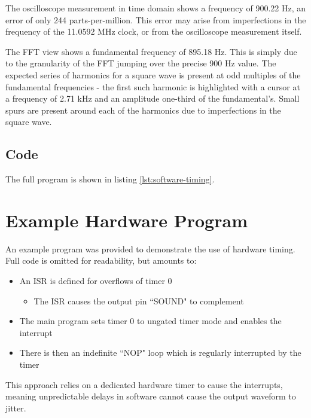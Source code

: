\documentclass[11pt]{article}
\begin{document}
The oscilloscope measurement in time domain shows a frequency of 900.22 Hz, an error of only 244 parts-per-million. This error may arise from imperfections in the frequency of the 11.0592 MHz clock, or from the oscilloscope measurement itself.

The FFT view shows a fundamental frequency of 895.18 Hz. This is simply due to the granularity of the FFT jumping over the precise 900 Hz value. The expected series of harmonics for a square wave is present at odd multiples of the fundamental frequencies - the first such harmonic is highlighted with a cursor at a frequency of 2.71 kHz and an amplitude one-third of the fundamental's. Small spurs are present around each of the harmonics due to imperfections in the square wave.

\subsection{Code}

The full program is shown in listing \ref{lst:software-timing}.



\section{Example Hardware Program}
An example program was provided to demonstrate the use of hardware timing. Full code is omitted for readability, but amounts to:\begin{itemize}
    \item An ISR is defined for overflows of timer 0\begin{itemize}
        \item The ISR causes the output pin ``SOUND" to complement
    \end{itemize}
    \item The main program sets timer 0 to ungated timer mode and enables the interrupt
    \item There is then an indefinite ``NOP" loop which is regularly interrupted by the timer
\end{itemize}

This approach relies on a dedicated hardware timer to cause the interrupts, meaning unpredictable delays in software cannot cause the output waveform to jitter.
\end{document}
